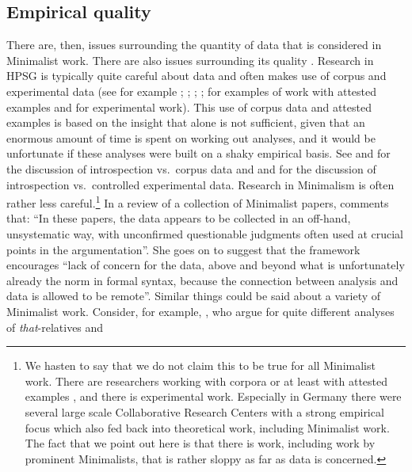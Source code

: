 \documentclass[output=paper
 	        ,biblatex
                ,babelshorthands
                ,newtxmath
                ,draftmode
                ,colorlinks, citecolor=brown
]{langscibook}
\begin{document}
\subsection{Empirical quality}
\label{sec-empirical-quality}

There are, then, issues surrounding the quantity of data that is considered in Minimalist work. There are
also issues surrounding its quality \citep{Schuetze2016a}. Research in HPSG is typically quite careful about data and often
makes use of corpus and experimental data (see for example
\citealt*{AA2017a-u,Mueller99a,Mueller2002b,BC2010a,MBC2012a,Chaves2013a-u,Miller2013a}; \citealt[Chapter~7]{VanEynde2015a-u};
\citealt{ACS2016a-u}; \citealt{SAHM2019a-u}; \citealt{Winckel2020a}
for examples of work with attested examples and for experimental work).
This use of corpus data and attested examples is based on the insight that  alone is not sufficient, given that an
enormous amount of time is spent on working out analyses, and it would be unfortunate if these analyses
were built on a shaky empirical basis. See  and  for the
discussion of introspection vs.\ corpus data and  and  for the discussion of introspection
vs.\ controlled experimental data.
Research in Minimalism is often rather less
careful.\footnote{
 We hasten to say that we do not claim this to be true for all Minimalist work. There are
 researchers working with corpora or at least with attested examples \citep{Wurmbrand2003a}, and
 there is experimental work. Especially in Germany there were several large scale Collaborative
 Research Centers with a strong empirical focus which also fed back into theoretical work, including
 Minimalist work. The fact that we point out here is that there is work, including work
 by prominent Minimalists, that is rather sloppy as far as data is concerned.%
} In a review of a collection of Minimalist papers, \citet[]{Bender2002b-u} comments that: ``In
these papers, the data appears to be collected in an off-hand, unsystematic way, with unconfirmed
questionable judgments often used at crucial points in the argumentation''. She goes on to suggest
that the framework encourages ``lack of concern for the data, above and beyond what is unfortunately
already the norm in formal syntax, because the connection between analysis and data is allowed to be
remote''. Similar things could be said about a variety of Minimalist work. Consider, for example,
\citet{AL2003a-u}, who argue for quite different analyses of \emph{that}-relatives and
\end{document}
